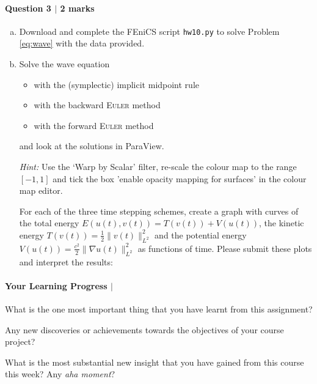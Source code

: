 \documentclass[10pt,letterpaper]{scrartcl}
\begin{document}
\newpage

\paragraph*{Question 3 $\vert$ 2 marks}

\begin{enumerate}[(a)]
\item \faFileCodeO \: Download and complete the \textsf{FEniCS} script \texttt{hw10.py} to solve Problem \eqref{eq:wave} with the data provided.
\item \faFilePdfO \: \faFilePictureO \:  Solve the wave equation
\begin{itemize}
\item with the (symplectic) implicit midpoint rule
\item with the backward \textsc{Euler} method
\item with the forward \textsc{Euler} method
\end{itemize}
and look at the solutions in \textsf{ParaView}.

\emph{Hint:} Use the `Warp by Scalar' filter, re-scale the colour map to the range $[-1,1]$ and tick the box 'enable opacity mapping for surfaces' in the colour map editor.

For each of the three time stepping schemes, create a graph with curves of the total energy $E(u(t),v(t)) = T(v(t)) + V(u(t))$, the kinetic energy $T(v(t)) = \frac{1}{2}\lVert v(t) \rVert_{L^2}^2$ and the potential energy $V(u(t)) = \frac{c^2}{2}\lVert \nabla u(t) \rVert_{L^2}^2$ as functions of time. Please submit these plots and interpret the results:
\vfill 
\end{enumerate}

\paragraph*{Your Learning Progress $\vert$ \faFilePdfO}

What is the one most important thing that you have learnt from this assignment?

\vspace*{3mm}
\hrulefill

\vspace*{3mm}
\hrulefill

Any new discoveries or achievements towards the objectives of your course project?

\vspace*{3mm}
\hrulefill

\vspace*{3mm}
\hrulefill

What is the most substantial new insight that you have gained from this course this week? Any \emph{aha moment}?

\vspace*{3mm}
\hrulefill

\vspace*{3mm}
\hrulefill
\end{document}
